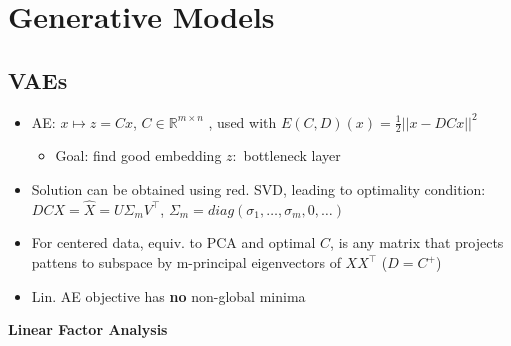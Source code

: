 \section{Generative Models}
\subsection{VAEs}
\begin{itemize}
    \item AE: \(x \mapsto z =Cx\), \(C \in \mathbb{R}^{m\times n}\) , used with \(E(C,D)(x)=\frac{1}{2}||x-DCx||^2\)
    \begin{itemize}
        \item Goal: find good embedding \(z:\) bottleneck layer
    \end{itemize}
\item Solution can be obtained using red. SVD, leading to optimality condition: \(DCX=\hat{X}=U\Sigma_mV^\top\), \(\Sigma_m=diag(\sigma_1,\dots,\sigma_m,0,\dots)\) 
\item For centered data, equiv. to PCA and optimal \(C\), is any matrix that projects pattens to subspace by m-principal eigenvectors of \(XX^\top\) (\(D=C^+\))
\item Lin. AE objective has \textbf{no} non-global minima 
\end{itemize}
\textbf{Linear Factor Analysis}
